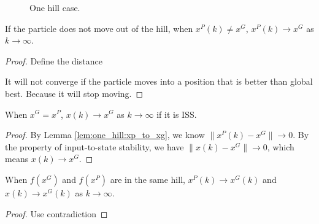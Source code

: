 \begin{figure}
\centering
{}
\caption{One hill case.}
\label{fig:one_hill_case}
\end{figure}

\begin{lemma}
\label{lem:one_hill:xp_to_xg}
If the particle does not move out of the hill, when $ x^{P}(k) \neq x^{G} $, $ x^{P}(k) \rightarrow x^{G} $ as $ k \rightarrow \infty $.
\begin{proof}
Define the distance

It will not converge if the particle moves into a position that is better than global best.
Because it will stop moving. 
\end{proof}
\end{lemma}

\begin{lemma}
When $  x^{G} = x^{P} $, $ x(k) \rightarrow x^{G} $ as $ k \rightarrow \infty $ if it is ISS.
\begin{proof}
By Lemma \ref{lem:one_hill:xp_to_xg}, we know $ \lVert x^{P}(k) - x^{G} \rVert \rightarrow 0 $.
By the property of input-to-state stability, we have $ \lVert x(k) - x^{G} \rVert \rightarrow 0 $, which means
$ x(k) \rightarrow x^{G} $.
\end{proof}
\end{lemma}

\begin{theorem}
When $ f(x^{G}) $ and $ f(x^{P}) $ are in the same hill, $ x^{P}(k) \rightarrow x^{G}(k) $ and $ x(k) \rightarrow x^{G}(k) $ as $ k \rightarrow \infty $.
\begin{proof}
Use contradiction
\end{proof}
\end{theorem}



